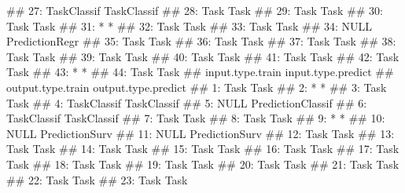 \documentclass[12pt,]{scrbook}
\newenvironment{Shaded}{}{}
\newcommand{\NormalTok}[1]{#1}
\begin{document}
\begin{Shaded}
\begin{Highlighting}[]
\NormalTok{## 27:      TaskClassif                   TaskClassif}
\NormalTok{## 28:             Task                          Task}
\NormalTok{## 29:             Task                          Task}
\NormalTok{## 30:             Task                          Task}
\NormalTok{## 31:                *                             *}
\NormalTok{## 32:             Task                          Task}
\NormalTok{## 33:             Task                          Task}
\NormalTok{## 34:             NULL                PredictionRegr}
\NormalTok{## 35:             Task                          Task}
\NormalTok{## 36:             Task                          Task}
\NormalTok{## 37:             Task                          Task}
\NormalTok{## 38:             Task                          Task}
\NormalTok{## 39:             Task                          Task}
\NormalTok{## 40:             Task                          Task}
\NormalTok{## 41:             Task                          Task}
\NormalTok{## 42:             Task                          Task}
\NormalTok{## 43:                *                             *}
\NormalTok{## 44:             Task                          Task}
\NormalTok{##     input.type.train            input.type.predict}
\NormalTok{##     output.type.train output.type.predict}
\NormalTok{##  1:              Task                Task}
\NormalTok{##  2:                 *                   *}
\NormalTok{##  3:              Task                Task}
\NormalTok{##  4:       TaskClassif         TaskClassif}
\NormalTok{##  5:              NULL   PredictionClassif}
\NormalTok{##  6:       TaskClassif         TaskClassif}
\NormalTok{##  7:              Task                Task}
\NormalTok{##  8:              Task                Task}
\NormalTok{##  9:                 *                   *}
\NormalTok{## 10:              NULL      PredictionSurv}
\NormalTok{## 11:              NULL      PredictionSurv}
\NormalTok{## 12:              Task                Task}
\NormalTok{## 13:              Task                Task}
\NormalTok{## 14:              Task                Task}
\NormalTok{## 15:              Task                Task}
\NormalTok{## 16:              Task                Task}
\NormalTok{## 17:              Task                Task}
\NormalTok{## 18:              Task                Task}
\NormalTok{## 19:              Task                Task}
\NormalTok{## 20:              Task                Task}
\NormalTok{## 21:              Task                Task}
\NormalTok{## 22:              Task                Task}
\NormalTok{## 23:              Task                Task}

\end{Highlighting}
\end{Shaded}
\end{document}
